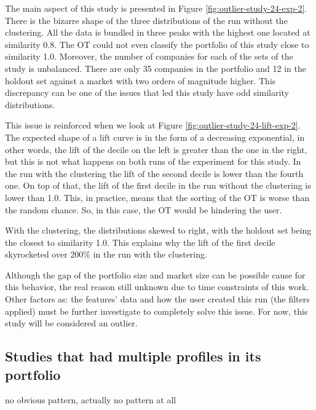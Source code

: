 The main aspect of this study is presented in Figure \ref{fig:outlier-study-24-exp-2}. There is the bizarre shape of the three distributions of the run without the clustering. All the data is bundled in three peaks with the highest one located at similarity 0.8. The OT could not even classify the portfolio of this study close to similarity 1.0. Moreover, the number of companies for each of the sets of the study is unbalanced. There are only 35 companies in the portfolio and 12 in the holdout set against a market with two orders of magnitude higher. This discrepancy can be one of the issues that led this study have odd similarity distributions.

This issue is reinforced when we look at Figure \ref{fig:outlier-study-24-lift-exp-2}. The expected shape of a lift curve is in the form of a decreasing exponential, in other words, the lift of the decile on the left is greater than the one in the right, but this is not what happens on both runs of the experiment for this study. In the run with the clustering the lift of the second decile is lower than the fourth one. On top of that, the lift of the first decile in the run without the clustering is lower than 1.0. This, in practice, means that the sorting of the OT is worse than the random chance. So, in this case, the OT would be hindering the user.

With the clustering, the distributions skewed to right, with the holdout set being the closest to similarity 1.0. This explains why the lift of the first decile skyrocketed over 200\% in the run with the clustering.

Although the gap of the portfolio size and market size can be possible cause for this behavior, the real reason still unknown due to time constraints of this work. Other factors as: the features' data and how the user created this run (the filters applied) must be further investigate to completely solve this issue. For now, this study will be considered an outlier.

\subsection{Studies that had multiple profiles in its portfolio}

no obvious pattern, actually no pattern at all

